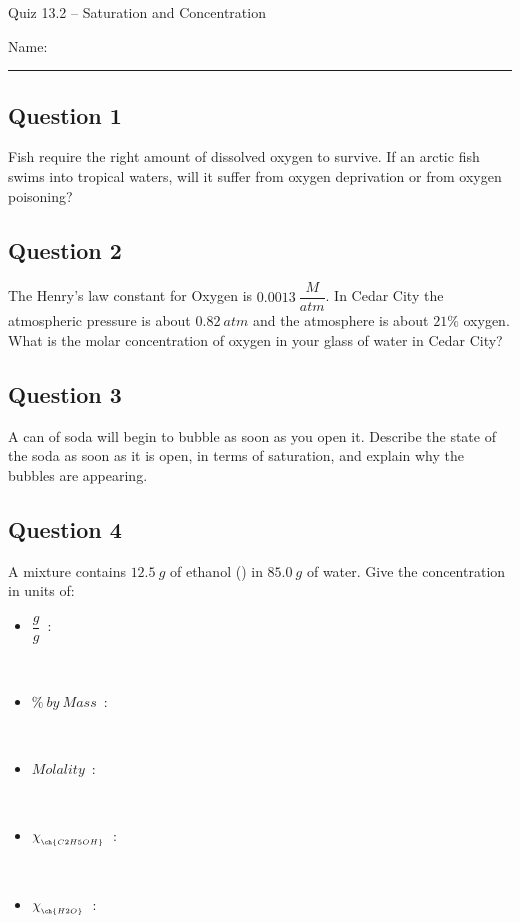 \documentclass[11pt, letterpaper]{memoir}
\begin{document}
	\begin{center}
		{\large	Quiz 13.2 -- Saturation and Concentration}
	\end{center}
	{\large Name: \rule[-1mm]{4in}{.1pt} 
	
	\subsection*{Question 1}
	Fish require the right amount of dissolved oxygen to survive. If an arctic fish swims into tropical waters, will it suffer from oxygen deprivation or from oxygen poisoning?
	
	\vspace{2em}
	\subsection*{Question 2}
	The Henry's law constant for Oxygen is $0.0013~\dfrac{M}{atm}$. In Cedar City the atmospheric pressure is about $0.82~atm$ and the atmosphere is about $21\%$ oxygen. What is the molar concentration of oxygen in your glass of water in Cedar City?

	\vspace{2em}
	\subsection*{Question 3}
	A can of soda will begin to bubble as soon as you open it. Describe the state of the soda as soon as it is open, in terms of saturation, and explain why the bubbles are appearing.
	
	\vspace{4em}
	\subsection*{Question 4}
	A mixture contains $12.5~g$ of ethanol () in $85.0~g$ of water. Give the concentration in units of:
	\begin{itemize}
		\item $\dfrac{g}{g}$~:
		
		~
		\item $\%~by~Mass$~:
		
		~
		\item $Molality$~:
		
		~
		\item $\chi_{_{\ch{C2H5OH}}}$~:
		
		~
		\item $\chi_{_{\ch{H2O}}}$~:
	\end{itemize}

}
\end{document}
